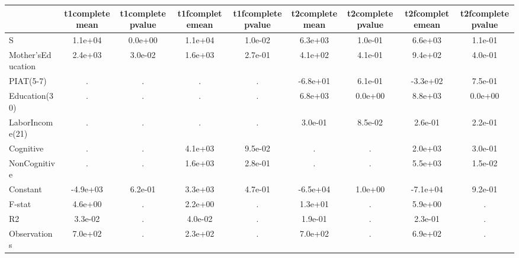 \begin{table}[htbp]
\begin{tabular}{lcccccccc} \hline \hline
 & t1completemean  & t1completepvalue  & t1fcompletemean  & t1fcompletepvalue  & t2completemean  & t2completepvalue  & t2fcompletemean  & t2fcompletepvalue  \\  \hline 
S &  1.1e+04 &  0.0e+00 &  1.1e+04 &  1.0e-02 &  6.3e+03 &  1.0e-01 &  6.6e+03 &  1.1e-01 \\  
Mother'sEducation &  2.4e+03 &  3.0e-02 &  1.6e+03 &  2.7e-01 &  4.1e+02 &  4.1e-01 &  9.4e+02 &  4.0e-01 \\  
PIAT(5-7) &         . &         . &         . &         . & -6.8e+01 &  6.1e-01 & -3.3e+02 &  7.5e-01 \\  
Education(30) &         . &         . &         . &         . &  6.8e+03 &  0.0e+00 &  8.8e+03 &  0.0e+00 \\  
LaborIncome(21) &         . &         . &         . &         . &  3.0e-01 &  8.5e-02 &  2.6e-01 &  2.2e-01 \\  
Cognitive &         . &         . &  4.1e+03 &  9.5e-02 &         . &         . &  2.0e+03 &  3.0e-01 \\  
NonCognitive &         . &         . &  1.6e+03 &  2.8e-01 &         . &         . &  5.5e+03 &  1.5e-02 \\  
Constant & -4.9e+03 &  6.2e-01 &  3.3e+03 &  4.7e-01 & -6.5e+04 &  1.0e+00 & -7.1e+04 &  9.2e-01 \\  
F-stat &  4.6e+00 &         . &  2.2e+00 &         . &  1.3e+01 &         . &  5.9e+00 &         . \\  
R2 &  3.3e-02 &         . &  4.0e-02 &         . &  1.9e-01 &         . &  2.3e-01 &         . \\  
Observations &  7.0e+02 &         . &  2.3e+02 &         . &  7.0e+02 &         . &  6.9e+02 &         . \\  
\hline \hline \end{tabular}
\end{table}
